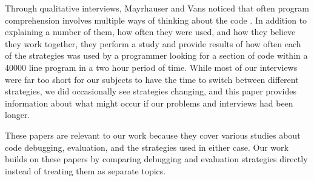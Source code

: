 Through qualitative interviews, Mayrhauser and Vans noticed that often program comprehension involves multiple ways of thinking about the code \cite{402076}.
In addition to explaining a number of them, how often they were used, and how they believe they work together, they perform a study and provide results of how often each of the strategies was used by a programmer looking for a section of code within a 40000 line program in a two hour period of time.
While most of our interviews were far too short for our subjects to have the time to switch between different strategies, we did occasionally see strategies changing, and this paper provides information about what might occur if our problems and interviews had been longer. 

These papers are relevant to our work because they cover various studies about code debugging, evaluation, and the strategies used in either case. Our work builds on these papers by comparing debugging and evaluation strategies directly instead of treating them as separate topics.
